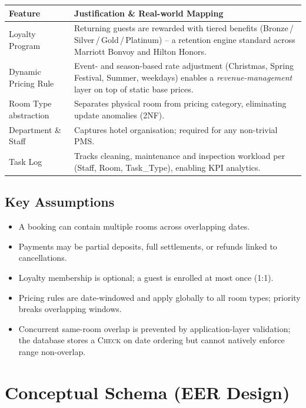 \documentclass[11pt,a4paper]{article}
\begin{document}
\begin{tabularx}{\linewidth}{@{}p{3.3cm} X@{}}
\toprule
\textbf{Feature} & \textbf{Justification \& Real-world Mapping} \\
\midrule
Loyalty Program       & Returning guests are rewarded with tiered benefits (Bronze\,/\,Silver\,/\,Gold\,/\,Platinum) -- a retention engine standard across Marriott Bonvoy and Hilton Honors. \\
Dynamic Pricing Rule  & Event- and season-based rate adjustment (Christmas, Spring Festival, Summer, weekdays) enables a \emph{revenue-management} layer on top of static base prices. \\
Room Type abstraction & Separates physical room from pricing category, eliminating update anomalies (2NF). \\
Department \& Staff   & Captures hotel organisation; required for any non-trivial PMS. \\
Task Log              & Tracks cleaning, maintenance and inspection workload per (Staff, Room, Task\_Type), enabling KPI analytics. \\
\bottomrule
\end{tabularx}

\subsection{Key Assumptions}
\begin{itemize}[leftmargin=*,topsep=2pt,itemsep=1pt]
    \item A booking can contain multiple rooms across overlapping dates.
    \item Payments may be partial deposits, full settlements, or refunds linked to cancellations.
    \item Loyalty membership is optional; a guest is enrolled at most once (1:1).
    \item Pricing rules are date-windowed and apply globally to all room types; priority breaks overlapping windows.
    \item Concurrent same-room overlap is prevented by application-layer validation; the database stores a \textsc{Check} on date ordering but cannot natively enforce range non-overlap.
\end{itemize}

\section{Conceptual Schema (EER Design)}
\end{document}
